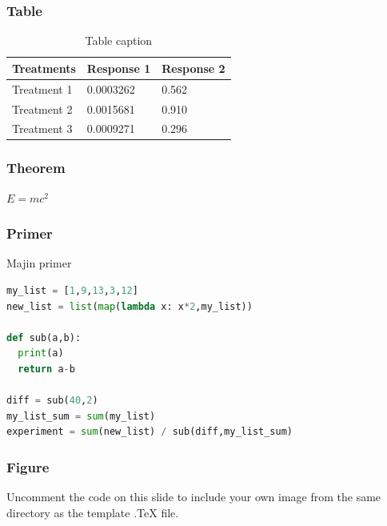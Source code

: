 \documentclass{beamer}
\begin{document}
\begin{frame}
\frametitle{Table}
\begin{table}
\begin{tabular}{l l l}
\toprule
\textbf{Treatments} & \textbf{Response 1} & \textbf{Response 2}\\
\midrule
Treatment 1 & 0.0003262 & 0.562 \\
Treatment 2 & 0.0015681 & 0.910 \\
Treatment 3 & 0.0009271 & 0.296 \\
\bottomrule
\end{tabular}
\caption{Table caption}
\end{table}
\end{frame}


\begin{frame}
\frametitle{Theorem}
\begin{theorem}
$E = mc^2$
\end{theorem}
\end{frame}


\begin{frame}[fragile] %
\frametitle{Primer}
\begin{exampleblock}{Majin primer}
  \begin{lstlisting}[language = python]
my_list = [1,9,13,3,12]
new_list = list(map(lambda x: x*2,my_list))

def sub(a,b):
  print(a)
  return a-b
  
diff = sub(40,2)
my_list_sum = sum(my_list)
experiment = sum(new_list) / sub(diff,my_list_sum)
   \end{lstlisting}
   \end{exampleblock}
\end{frame}


\begin{frame}
\frametitle{Figure}
Uncomment the code on this slide to include your own image from the same directory as the template .TeX file.
\end{frame}

\end{document}
